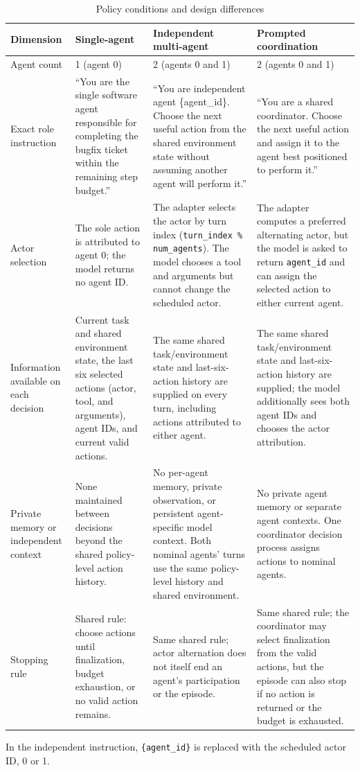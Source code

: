 \documentclass[12pt,a4paper,oneside]{report}
\begin{document}
\begin{table}[htbp]
\centering
\small
\setlength{\tabcolsep}{4pt}
\begin{tabularx}{\linewidth}{|Y|Y|Y|Y|}
\hline
\textbf{Dimension} & \textbf{Single-agent} & \textbf{Independent multi-agent} & \textbf{Prompted coordination} \\
\hline
Agent count & 1 (agent 0) & 2 (agents 0 and 1) & 2 (agents 0 and 1) \\
\hline
Exact role instruction & “You are the single software agent responsible for completing the bugfix ticket within the remaining step budget.” & “You are independent agent \{agent\allowbreak\_id\}. Choose the next useful action from the shared environment state without assuming another agent will perform it.” & “You are a shared coordinator. Choose the next useful action and assign it to the agent best positioned to perform it.” \\
\hline
Actor selection & The sole action is attributed to agent 0; the model returns no agent ID. & The adapter selects the actor by turn index (\texttt{turn\allowbreak\_index \% num\allowbreak\_agents}). The model chooses a tool and arguments but cannot change the scheduled actor. & The adapter computes a preferred alternating actor, but the model is asked to return \texttt{agent\allowbreak\_id} and can assign the selected action to either current agent. \\
\hline
Information available on each decision & Current task and shared environment state, the last six selected actions (actor, tool, and arguments), agent IDs, and current valid actions. & The same shared task/environment state and last-six-action history are supplied on every turn, including actions attributed to either agent. & The same shared task/environment state and last-six-action history are supplied; the model additionally sees both agent IDs and chooses the actor attribution. \\
\hline
Private memory or independent context & None maintained between decisions beyond the shared policy-level action history. & No per-agent memory, private observation, or persistent agent-specific model context. Both nominal agents’ turns use the same policy-level history and shared environment. & No private agent memory or separate agent contexts. One coordinator decision process assigns actions to nominal agents. \\
\hline
Stopping rule & Shared rule: choose actions until finalization, budget exhaustion, or no valid action remains. & Same shared rule; actor alternation does not itself end an agent’s participation or the episode. & Same shared rule; the coordinator may select finalization from the valid actions, but the episode can also stop if no action is returned or the budget is exhausted. \\
\hline
\end{tabularx}
\caption{Policy conditions and design differences}
\end{table}
In the independent instruction, \texttt{\{agent\allowbreak\_id\}} is replaced with the scheduled actor ID, 0 or 1.
\end{document}
